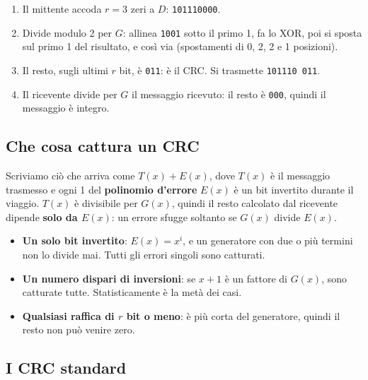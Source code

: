 \begin{enumerate}
    \item Il mittente accoda $r = 3$ zeri a $D$: \texttt{101110000}.
    \item Divide modulo 2 per $G$: allinea \texttt{1001} sotto il primo 1, fa lo XOR, poi si sposta sul primo 1 del risultato, e così via
          (spostamenti di 0, 2, 2 e 1 posizioni).
    \item Il resto, sugli ultimi $r$ bit, è \texttt{011}: è il CRC. Si trasmette \texttt{101110\,011}.
    \item Il ricevente divide per $G$ il messaggio ricevuto: il resto è \texttt{000}, quindi il messaggio è integro.
\end{enumerate}


\subsection{Che cosa cattura un CRC}

Scriviamo ciò che arriva come $T(x) + E(x)$, dove $T(x)$ è il messaggio trasmesso e ogni 1 del \textbf{polinomio d'errore} $E(x)$ è
un bit invertito durante il viaggio. $T(x)$ è divisibile per $G(x)$, quindi il resto calcolato dal ricevente dipende \textbf{solo da
$E(x)$}: un errore sfugge soltanto se $G(x)$ divide $E(x)$.

\begin{itemize}
    \item \textbf{Un solo bit invertito}: $E(x) = x^i$, e un generatore con due o più termini non lo divide mai. Tutti gli errori
          singoli sono catturati.
    \item \textbf{Un numero dispari di inversioni}: se $x + 1$ è un fattore di $G(x)$, sono catturate tutte. Statisticamente è la metà
          dei casi.
    \item \textbf{Qualsiasi raffica di $r$ bit o meno}: è più corta del generatore, quindi il resto non può venire zero.
\end{itemize}

\subsection{I CRC standard}

